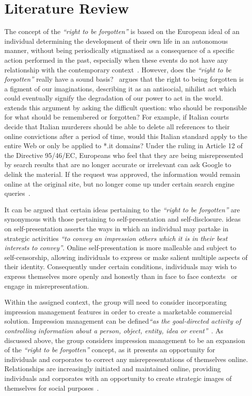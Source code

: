 \section{Literature Review}

The concept of the \emph{``right to be forgotten''} is based on the European ideal of an individual determining the development of their own life in an autonomous manner, without being periodically stigmatised as a consequence of a specific action performed in the past, especially when these events do not have any relationship with the contemporary context~\parencite{art:eu_forgotten}. However, does the \emph{``right to be forgotten''} really have a sound basis?~\cite{web:no_right_forgotten} argues that the right to being forgotten is a figment of our imaginations, describing it as an antisocial, nihilist act which could eventually signify the degradation of our power to act in the world.~\cite{web:foggy_thinking} extends this argument by asking the difficult question: who should be responsible for what should be remembered or forgotten? For example, if Italian courts decide that Italian murderers should be able to delete all references to their online convictions after a period of time, would this Italian standard apply to the entire Web or only be applied to *.it domains? Under the ruling in Article 12 of the Directive 95/46/EC, Europeans who feel that they are being misrepresented by search results that are no longer accurate or irrelevant can ask Google to delink the material. If the request was approved, the information would remain online at the original site, but no longer come up under certain search engine queries~\parencite{web:right_to_be_forgotten}. 

It can be argued that certain ideas pertaining to the \emph{``right to be forgotten''} are synonymous with those pertaining to self-presentation and self-disclosure. \cite{book:self_presentation} ideas on self-presentation asserts the ways in which an individual may partake in strategic activities \emph{``to convey an impression others which it is in their best interests to convey''}. Online self-presentation is more malleable and subject to self-censorship, allowing individuals to express or make salient multiple aspects of their identity. Consequently under certain conditions, individuals may wish to express themselves more openly and honestly than in face to face contexts~\parencite{art:manage_impress} or engage in misrepresentation.

Within the assigned context, the group will need to consider incorporating impression management features in order to create a marketable commercial solution. Impression management can be defined\emph{``as the goal-directed activity of controlling information about a person, object, entity, idea or event''}~\parencite{art:appearing_competent}. As discussed above, the group considers impression management to be an expansion of the \emph{``right to be forgotten''} concept, as it presents an opportunity for individuals and corporates to correct any misrepresentations of themselves online. Relationships are increasingly initiated and maintained online, providing individuals and corporates with an opportunity to create strategic images of themselves for social purposes~\parencite{art:olm}.


